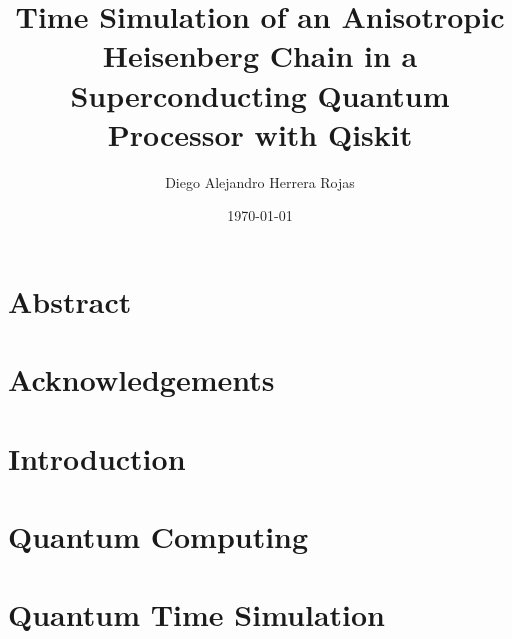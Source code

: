 \documentclass[twoside]{report}
\title{Time Simulation of an Anisotropic Heisenberg Chain in a Superconducting Quantum Processor with Qiskit}
\author{Diego Alejandro Herrera Rojas}
\date{\today}
\begin{document}
  
  \tableofcontents
  \chapter*{Abstract}
  \label{abstract}
  
  \chapter*{Acknowledgements}
  \label{ackn}
  
  \chapter{Introduction}
  \label{chap:intro}
  
  \chapter{Quantum Computing}
  \label{chap:qc}
  
  \chapter{Quantum Time Simulation}
  \label{chap:qts}
  
\end{document}
